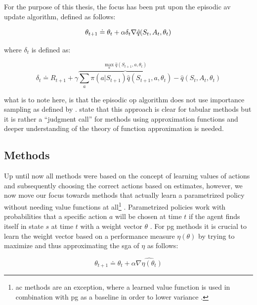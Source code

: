 For the purpose of this thesis, the focus has been put upon the episodic \gls{av} update algorithm, defined as follows:

\begin{equation}
	\theta_{t+1} \doteq \theta_t + \alpha \delta_t \nabla \hat{q} (S_t,A_t,\theta_t)\\
\end{equation}

where $\delta_t$ is defined as:

\begin{equation}
	\delta_t \doteq R_{t+1} + \gamma \overbrace{\sum_a \pi (a|S_{t+1}) \hat{q} (S_{t+1},a,\theta_t)}^{\max_a \hat{q} (S_{t+1},a,\theta_t)} - \hat{q} (S_t,A_t,\theta_t)
\end{equation}

what is to note here, is that the episodic \gls{op} algorithm does not use importance sampling as defined by  \citep[p. 244]{Sutton2017}. \citet[p. 244]{Sutton2017} state that this approach is clear for tabular methods but it is rather a ``judgment call'' for methods using approximation functions and deeper understanding of the theory of function approximation is needed.

\subsection{ Methods}
\label{subsec:polgrad_methods}

Up until now all methods were based on the concept of learning values of actions and subsequently choosing the correct actions based on estimates, however, we now move our focus towards methods that actually learn a parametrized policy without needing value functions at all\footnote{\gls{ac} methods are an exception, where a learned value function is used in combination with \gls{pg} as a baseline in order to lower variance \citep{Sutton2017}.}  \citep[p. 265]{Sutton2017}. Parametrized policies work with probabilities that a specific action $a$ will be chosen at time $t$ if the agent finds itself in state $s$ at time $t$ with a weight vector $\theta$ \citep[p. 265]{Sutton2017}. For \gls{pg} methods it is crucial to learn the weight vector based on a performance measure $\eta(\theta)$ by trying to maximize and thus approximating the \gls{sga} of $\eta$ as follows:

\begin{equation}
	\theta_{t+1} \doteq \theta_t + \alpha \widehat{\nabla \eta (\theta_t)}
\end{equation}

